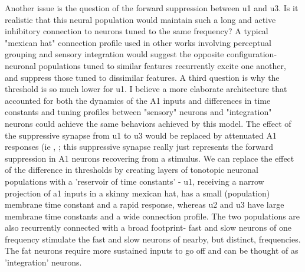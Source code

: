 Another issue is the question of the forward suppression between u1 and u3. Is it realistic that this neural population would maintain such a long and active inhibitory connection to neurons tuned to the same frequency? A typical "mexican hat" connection profile used in other works involving perceptual grouping and sensory integration \cite{Marti2013a} would suggest the opposite configuration- neuronal populations tuned to similar features recurrently excite one another, and suppress those tuned to dissimilar features. A third question is why the threshold is so much lower for u1. 
I believe a more elaborate architecture that accounted for both the dynamics of the A1 inputs and differences in time constants and tuning profiles between "sensory" neurons and "integration" neurons could achieve the same behaviors achieved by this model. The effect of the suppressive synapse from u1 to u3 would be replaced by attenuated A1 responses (ie \cite{Micheyl2005}, \cite{Micheyl2007} ; this suppressive synapse really just represents the forward suppression in A1 neurons recovering from a stimulus. 
We can replace the effect of the difference in thresholds by creating layers of tonotopic neuronal populations with a 'reservoir of time constants' - u1, receiving a narrow projection of a1 inputs in a skinny mexican hat, has a small (population) membrane time constant and a rapid response, whereas u2 and u3 have large membrane time constants and a wide connection profile. The two populations are also recurrently connected with a broad footprint- fast and slow neurons of one frequency stimulate the fast and slow neurons of nearby, but distinct, frequencies. The fat neurons require more sustained inputs to go off and can be thought of as 'integration' neurons.